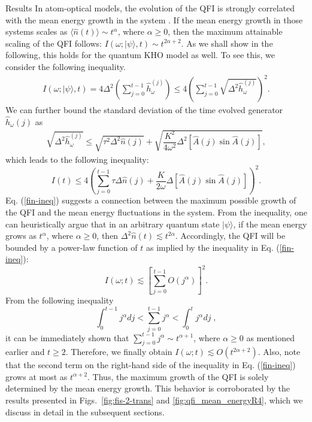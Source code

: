 \documentclass[amsmath,nobibnotes,aps,amssymb,pra, prl,aps,showpacs,superscriptaddress,twocolumn, longbibliography, reprint]{revtex4-2}
\begin{document}
\begin{section}{Results}
In atom-optical models, the evolution of the QFI is strongly correlated with the mean energy growth in the system \cite{pang2017optimal, giovannetti2006quantum, garbe2022critical}. If the mean energy growth in those systems scales as $\langle\hat{n}(t)\rangle\sim t^\alpha$, where $\alpha\geq 0$, then the maximum attainable scaling of the QFI follows: $I(\omega ;|\psi\rangle, t)\sim t^{2\alpha+2}$. As we shall show in the following,  this holds for the quantum KHO model as well. To see this, we consider the following inequality.
\begin{eqnarray}\label{bound}
I(\omega; |\psi\rangle, t)=4\Delta^2\left(\sum_{j=0}^{t-1}\hat{h}^{(j)}_{\omega}\right)\leq 4\left(\sum_{j=0}^{t-1}\sqrt{\Delta^2\hat{h}^{(j)}_{\omega}}\right)^2.
\end{eqnarray}
We can further bound the standard deviation of the time evolved generator $\hat{h}_{\omega}(j)$ as 
\begin{eqnarray}
\sqrt{\Delta^2 \hat{h}^{(j)}_{\omega}}\leq\sqrt{\tau^2\Delta^2\hat{n}(j)}+\sqrt{\dfrac{K^2}{4\omega^2}\Delta^2 \left[\hat{A}(j)\sin{\hat{A}}(j)\right]},
\end{eqnarray}
which leads to the following inequality:
\begin{equation}\label{fin-ineq}
I(t)\leq 4 \left(\sum_{j=0}^{t-1}\tau\Delta \hat{n}(j)+\dfrac{K}{2\omega}\Delta \left[\hat{A}(j)\sin \hat{A}(j)\right]\right)^2.
\end{equation}
Eq. (\ref{fin-ineq}) suggests a connection between the maximum possible growth of the QFI and the mean energy fluctuations in the system. From the inequality, one can heuristically argue that in an arbitrary quantum state $|\psi\rangle$, if the mean energy grows as $t^\alpha$, where $\alpha\geq 0$, then $\Delta^2 \hat{n}(t)\lesssim t^{2\alpha}$. Accordingly, the QFI will be bounded by a power-law function of $t$ as implied by the inequality in Eq. (\ref{fin-ineq}):
\begin{equation}
I(\omega; t)\lesssim [\sum_{j=0}^{t-1} O(j^\alpha)]^2.    
\end{equation}
From the following inequality
\begin{equation*}
\int_{0}^{t-1}j^{\alpha}dj<\sum_{j=0}^{t-1} j^\alpha <\int_{0}^{t}j^{\alpha}dj\;,    
\end{equation*} 
it can be immediately shown that $\sum_{j=0}^{t-1} j^\alpha\sim t^{\alpha+1}$, where $\alpha\geq 0$ as mentioned earlier and $t\geq 2$. Therefore, we finally obtain $I(\omega; t)\lesssim O(t^{2\alpha +2})$. Also, note that the second term on the right-hand side of the inequality in Eq. (\ref{fin-ineq}) grows at most as $t^{\alpha+2}$. Thus, the maximum growth of the QFI is solely determined by the mean energy growth. This behavior is corroborated by the results presented in Figs.~\ref{fig:fis-2-trans} and \ref{fig:qfi_mean_energyR4}, which we discuss in detail in the subsequent sections.





\end{section}
\end{document}
